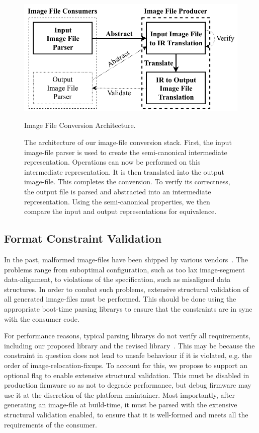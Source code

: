 \begin{figure}[htb]
  \centering
  \includegraphics{Figures/ImageGenStack.pdf}
  \caption{Image File Conversion Architecture.}
  \label{fig:img_conv_arch}
  \caption*{The architecture of our \gls{image-file} conversion stack. First, the input \gls{image-file} parser is used to create the semi-canonical intermediate representation. Operations can now be performed on this intermediate representation. It is then translated into the output \gls{image-file}. This completes the conversion. To verify its correctness, the output file is parsed and abstracted into an intermediate representation. Using the semi-canonical properties, we then compare the input and output representations for equivalence.}
\end{figure}

\subsection{Format Constraint Validation}
\label{sec:constr_val}

In the past, malformed \glspl{image-file} have been shipped by various vendors~\cite{ipxe-fix,gnu-efi-fix}. The problems range from suboptimal configuration, such as too lax \gls{image-segment} \gls{data-alignment}, to violations of the  specification, such as misaligned data structures. In order to combat such problems, extensive structural validation of all generated \glspl{image-file} must be performed. This should be done using the appropriate boot-time parsing \glspl{library} to ensure that the constraints are in sync with the consumer code.

For performance reasons, typical parsing \glspl{library} do not verify all requirements, including our proposed  \gls{library} and the revised  \gls{library}~\cite{secure-pe}. This may be because the constraint in question does not lead to unsafe behaviour if it is violated, e.g. the order of \glspl{image-relocation-fixup}. To account for this, we propose to support an optional flag to enable extensive structural validation. This must be disabled in production \gls{firmware} so as not to degrade performance, but debug \gls{firmware} may use it at the discretion of the platform maintainer. Most importantly, after generating an \gls{image-file} at build-time, it must be parsed with the extensive structural validation enabled, to ensure that it is well-formed and meets all the requirements of the consumer.

